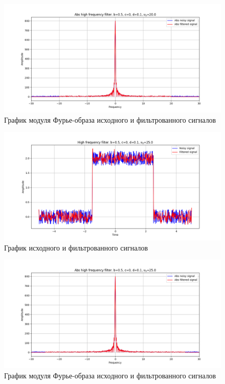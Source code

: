 \documentclass[a4paper, 12pt]{article}
\begin{document}
    \begin{figure}[!htb]
        \centering
        \includegraphics[scale=0.485]{6_abs_u_U_nohigh.png}
        \captionsetup{skip=0pt}
        \caption{График модуля Фурье-образа исходного и фильтрованного сигналов}
        \label{fig:fig22}
    \end{figure}
    \begin{figure}[!htb]
        \centering
        \includegraphics[scale=0.485]{10_u_flt_u_nohigh.png}
        \captionsetup{skip=0pt}
        \caption{График исходного и фильтрованного сигналов}
        \label{fig:fig23}
    \end{figure}
    \begin{figure}[!htb]
        \centering
        \includegraphics[scale=0.485]{10_abs_u_U_nohigh.png}
        \captionsetup{skip=0pt}
        \caption{График модуля Фурье-образа исходного и фильтрованного сигналов}
        \label{fig:fig24}
    \end{figure}
\end{document}
